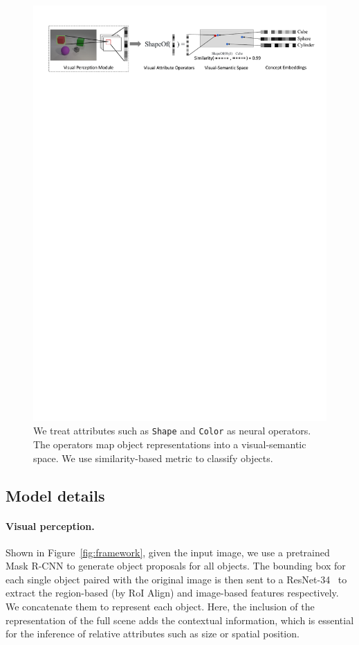 \documentclass{article} %
\newcommand{\fig}[1]{Figure~\ref{#1}}
\begin{document}
%
%

%
\begin{figure}[t]
\centering%
\includegraphics[width=\textwidth]{raw/VSE.pdf}
\caption{We treat attributes such as \texttt{Shape} and \texttt{Color} as neural operators. The operators map object representations into a visual-semantic space. We use similarity-based metric to classify objects.}
\vspace{-5pt}
\label{fig:vse}
\end{figure}
 
\subsection{Model details}

\paragraph{Visual perception.}
Shown in \fig{fig:framework}, given the input image, we use a pretrained Mask R-CNN \citep{He2017Mask} to generate object proposals for all objects. The bounding box for each single object paired with the original image is then sent to a ResNet-34~\citep{He2015Deep} to extract the region-based (by RoI Align) and image-based features respectively. We concatenate them to represent each object. Here, the inclusion of the representation of the full scene adds the contextual information, which is essential for the inference of relative attributes such as size or spatial position.
\end{document}
